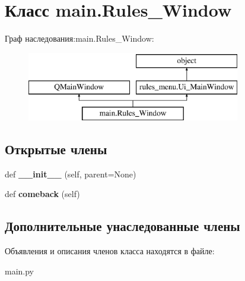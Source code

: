 \hypertarget{classmain_1_1_rules___window}{}\section{Класс main.\+Rules\+\_\+\+Window}
\label{classmain_1_1_rules___window}
Граф наследования\+:main.\+Rules\+\_\+\+Window\+:\begin{figure}[H]
\begin{center}
\leavevmode
\includegraphics[height=3.000000cm]{classmain_1_1_rules___window}
\end{center}
\end{figure}
\subsection*{Открытые члены}
\begin{DoxyCompactItemize}
\item 
\mbox{\label{classmain_1_1_rules___window_ac82e3902daff69490a53ca4a3bb4f4a3}} 
def {\bfseries \+\_\+\+\_\+init\+\_\+\+\_\+} (self, parent=None)
\item 
\mbox{\label{classmain_1_1_rules___window_ac5d70963fc438bcbadd0f85edac848ba}} 
def {\bfseries comeback} (self)
\end{DoxyCompactItemize}
\subsection*{Дополнительные унаследованные члены}


Объявления и описания членов класса находятся в файле\+:\begin{DoxyCompactItemize}
\item 
main.\+py\end{DoxyCompactItemize}
